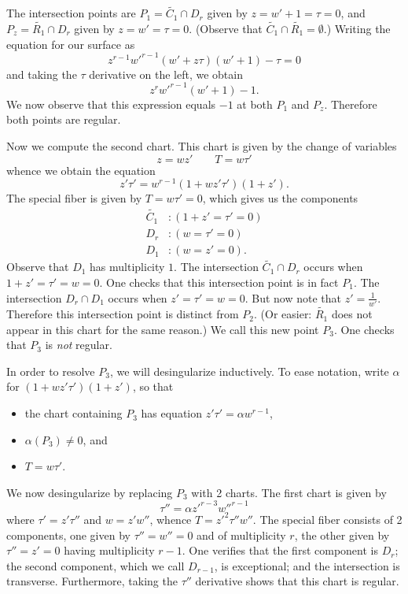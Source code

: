 \documentclass[reqno]{amsart}
\theoremstyle{definition}
\theoremstyle{remark}
\begin{document}
The intersection points are $P_1 = \tilde{C_1} \cap D_r$ given by $z=w'+1=\tau=0$, and $P_z = \tilde{R_1} \cap D_r$ given by $z=w'=\tau=0$. (Observe that $\tilde{C_1} \cap \tilde{R_1} = \emptyset$.) Writing the equation for our surface as
\[
z^{r-1}w'^{r-1}(w' + z\tau)(w' + 1) - \tau = 0
\]
and taking the $\tau$ derivative on the left, we obtain
\[
z^rw'^{r-1}(w' + 1) - 1.
\]
We now observe that this expression equals $-1$ at both $P_1$ and $P_z$. Therefore both points are regular.

Now we compute the second chart. This chart is given by the change of variables
\[
z=wz' \qquad T=w\tau'
\]
whence we obtain the equation
\[
z'\tau' = w^{r-1}(1 + wz'\tau')(1 + z').
\]
The special fiber is given by $T = w\tau' = 0$, which gives us the components
\begin{align*}
  \tilde{C_1}&: (1 + z' = \tau' = 0) \\
  D_r&: (w = \tau' = 0) \\
  D_1&: (w = z' = 0).
\end{align*}
Observe that $D_1$ has multiplicity $1$. The intersection $\tilde{C_1} \cap D_r$ occurs when $1 + z' = \tau' = w = 0$. One checks that this intersection point is in fact $P_1$. The intersection $D_r \cap D_1$ occurs when $z' = \tau' = w = 0$. But now note that $z' = \frac{1}{w'}$. Therefore this intersection point is distinct from $P_2$. (Or easier: $\tilde{R_1}$ does not appear in this chart for the same reason.) We call this new point $P_3$. One checks that $P_3$ is \emph{not} regular.

In order to resolve $P_3$, we will desingularize inductively. To ease notation, write $\alpha$ for $(1 + wz'\tau')(1 + z')$, so that
\begin{itemize}
    \item the chart containing $P_3$ has equation $z'\tau' = \alpha w^{r-1}$,
    \item $\alpha(P_3) \neq 0$, and
    \item $T = w\tau'$.
\end{itemize}

We now desingularize by replacing $P_3$ with 2 charts. The first chart is given by
\[
\tau'' = \alpha z'^{r-3} w''^{r-1}
\]
where $\tau' = z' \tau''$ and $w = z' w''$, whence $T = z'^2 \tau'' w''$. The special fiber consists of 2 components, one given by $\tau'' = w'' = 0$ and of multiplicity $r$, the other given by $\tau'' = z' = 0$ having multiplicity $r-1$. One verifies that the first component is $D_r$; the second component, which we call $D_{r-1}$, is exceptional; and the intersection is transverse. Furthermore, taking the $\tau''$ derivative shows that this chart is regular.
\end{document}
